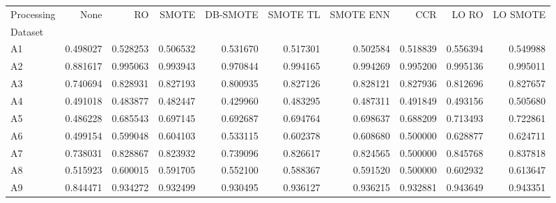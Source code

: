 \begin{tabular}{lrrrrrrrrr}
\toprule
Processing &      None &        RO &     SMOTE &  DB-SMOTE &  SMOTE TL &  SMOTE ENN &       CCR &     LO RO &  LO SMOTE \\
Dataset &           &           &           &           &           &            &           &           &           \\
\midrule
A1      &  0.498027 &  0.528253 &  0.506532 &  0.531670 &  0.517301 &   0.502584 &  0.518839 &  0.556394 &  0.549988 \\
A2      &  0.881617 &  0.995063 &  0.993943 &  0.970844 &  0.994165 &   0.994269 &  0.995200 &  0.995136 &  0.995011 \\
A3      &  0.740694 &  0.828931 &  0.827193 &  0.800935 &  0.827126 &   0.828121 &  0.827936 &  0.812696 &  0.827657 \\
A4      &  0.491018 &  0.483877 &  0.482447 &  0.429960 &  0.483295 &   0.487311 &  0.491849 &  0.493156 &  0.505680 \\
A5      &  0.486228 &  0.685543 &  0.697145 &  0.692687 &  0.694764 &   0.698637 &  0.688209 &  0.713493 &  0.722861 \\
A6      &  0.499154 &  0.599048 &  0.604103 &  0.533115 &  0.602378 &   0.608680 &  0.500000 &  0.628877 &  0.624711 \\
A7      &  0.738031 &  0.828867 &  0.823932 &  0.739096 &  0.826617 &   0.824565 &  0.500000 &  0.845768 &  0.837818 \\
A8      &  0.515923 &  0.600015 &  0.591705 &  0.552100 &  0.588367 &   0.591520 &  0.500000 &  0.602932 &  0.613647 \\
A9      &  0.844471 &  0.934272 &  0.932499 &  0.930495 &  0.936127 &   0.936215 &  0.932881 &  0.943649 &  0.943351 \\
\bottomrule
\end{tabular}
